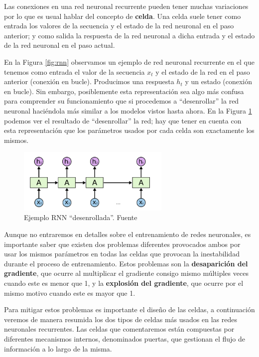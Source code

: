 Las conexiones en una red neuronal recurrente pueden tener muchas variaciones por lo que es usual hablar del concepto de \textbf{celda}. Una celda suele tener como entrada los valores de la secuencia y el estado de la red neuronal en el paso anterior; y como salida la respuesta de la red neuronal a dicha entrada y el estado de la red neuronal en el paso actual. 



En la Figura \ref{fig:rnn} observamos un ejemplo de red neuronal recurrente en el que tenemos como entrada el valor de la secuencia $x_{t}$ y el estado de la red en el paso anterior (conexión en bucle). Producimos una respuesta $h_{t}$ y un estado (conexión en bucle). Sin embargo, posiblemente esta representación sea algo más confusa para comprender su funcionamiento que si procedemos a ``desenrollar'' la red neuronal haciéndola más similar a los modelos vistos hasta ahora. En la Figura \ref{fig:rnn2} podemos ver el resultado de ``desenrollar'' la red; hay que tener en cuenta con esta representación que los parámetros usados por cada celda son exactamente los mismos.

\begin{figure}[!ht]
	\centering
	\includegraphics[width=0.65\textwidth]{images/arte/rnn2}
	\caption{Ejemplo RNN ``desenrollada''. Fuente \cite{colahblog}}
	\label{fig:rnn2}
\end{figure}



Aunque no entraremos en detalles sobre el entrenamiento de redes neuronales, es importante saber que existen dos problemas diferentes provocados ambos por usar los mismos parámetros en todas las celdas que provocan la inestabilidad durante el proceso de entrenamiento. Estos problemas son la \textbf{desaparición del gradiente}, que ocurre al multiplicar el gradiente consigo mismo múltiples veces cuando este es menor que 1, y la \textbf{explosión del gradiente}, que ocurre por el mismo motivo cuando este es mayor que 1. 

Para mitigar estos problemas es importante el diseño de las celdas, a continuación veremos de manera resumida los dos tipos de celdas más usados en las redes neuronales recurrentes. Las celdas que comentaremos están compuestas por diferentes mecanismos internos, denominados puertas, que gestionan el flujo de información a lo largo de la misma. 


